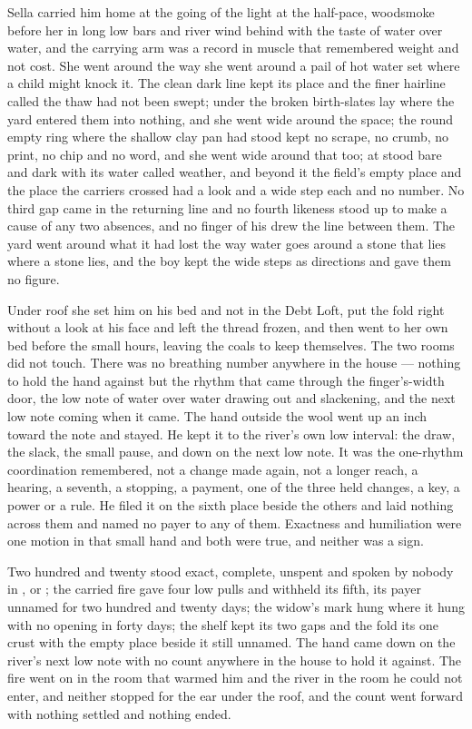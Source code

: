 \scenebreak

Sella carried him home at the going of the light at the half-pace, woodsmoke before her in long low bars and river wind behind with the taste of water over water, and the carrying arm was a record in muscle that remembered weight and not cost. She went around  the way she went around a pail of hot water set where a child might knock it. The clean dark line kept its place and the finer hairline called the thaw had not been swept; under  the broken birth-slates lay where the yard entered them into nothing, and she went wide around the space; the round empty ring where the shallow clay pan had stood kept no scrape, no crumb, no print, no chip and no word, and she went wide around that too; at   stood bare and dark with its water called weather, and beyond it the field's empty place and the place the carriers crossed had a look and a wide step each and no number. No third gap came in the returning line and no fourth likeness stood up to make a cause of any two absences, and no finger of his drew the line between them. The yard went around what it had lost the way water goes around a stone that lies where a stone lies, and the boy kept the wide steps as directions and gave them no figure.

Under  roof she set him on his bed and not in the Debt Loft, put the fold right without a look at his face and left the thread frozen, and then went to her own bed before the small hours, leaving the coals to keep themselves. The two rooms did not touch. There was no breathing number anywhere in the house --- nothing to hold the hand against but the rhythm that came through the finger's-width door, the low note of water over water drawing out and slackening, and the next low note coming when it came. The hand outside the wool went up an inch toward the note and stayed. He kept it to the river's own low interval: the draw, the slack, the small pause, and down on the next low note. It was the one-rhythm coordination remembered, not a change made again, not a longer reach, a hearing, a seventh, a stopping, a payment, one of the three held changes, a key, a power or a rule. He filed it on the sixth place beside the others and laid nothing across them and named no payer to any of them. Exactness and humiliation were one motion in that small hand and both were true, and neither was a sign.

Two hundred and twenty stood exact, complete, unspent and spoken by nobody in ,  or ; the carried fire gave four low pulls and withheld its fifth, its payer unnamed for two hundred and twenty days; the widow's mark hung where it hung with no opening in forty days; the shelf kept its two gaps and the fold its one crust with the empty place beside it still unnamed. The hand came down on the river's next low note with no count anywhere in the house to hold it against. The fire went on in the room that warmed him and the river in the room he could not enter, and neither stopped for the ear under the roof, and the count went forward with nothing settled and nothing ended.
